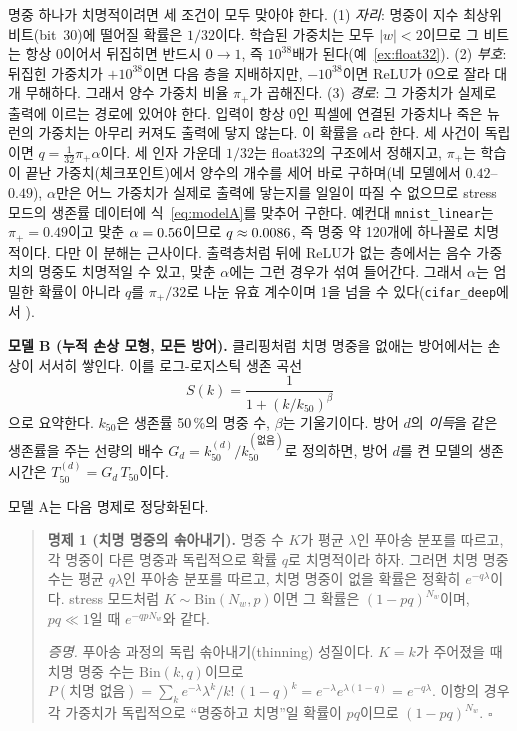 \documentclass[11pt,a4paper]{article}
\newcommand{\code}[1]{\texttt{#1}}
\newcounter{note}
\begin{document}
\begin{note}[$q$의 세 인자]
\label{note:q}
명중 하나가 치명적이려면 세 조건이 모두 맞아야 한다. (1) \emph{자리}: 명중이 지수 최상위 비트(bit~30)에 떨어질 확률은 $1/32$이다. 학습된 가중치는 모두 $|w|<2$이므로 그 비트는 항상 0이어서 뒤집히면 반드시 $0\to1$, 즉 $10^{38}$배가 된다(예~\ref{ex:float32}). (2) \emph{부호}: 뒤집힌 가중치가 $+10^{38}$이면 다음 층을 지배하지만, $-10^{38}$이면 ReLU가 0으로 잘라 대개 무해하다. 그래서 양수 가중치 비율 $\pi_+$가 곱해진다. (3) \emph{경로}: 그 가중치가 실제로 출력에 이르는 경로에 있어야 한다. 입력이 항상 0인 픽셀에 연결된 가중치나 죽은 뉴런의 가중치는 아무리 커져도 출력에 닿지 않는다. 이 확률을 $\alpha$라 한다. 세 사건이 독립이면 $q=\tfrac{1}{32}\pi_+\alpha$이다. 세 인자 가운데 $1/32$는 float32의 구조에서 정해지고, $\pi_+$는 학습이 끝난 가중치(체크포인트)에서 양수의 개수를 세어 바로 구하며(네 모델에서 $0.42$--$0.49$), $\alpha$만은 어느 가중치가 실제로 출력에 닿는지를 일일이 따질 수 없으므로 stress 모드의 생존률 데이터에 식~\eqref{eq:modelA}를 맞추어 구한다. 예컨대 \code{mnist\_linear}는 $\pi_+=0.49$이고 맞춘 $\alpha=0.56{}$이므로 $q\approx0.0086{}$, 즉 명중 약 120개에 하나꼴로 치명적이다. 다만 이 분해는 근사이다. 출력층처럼 뒤에 ReLU가 없는 층에서는 음수 가중치의 명중도 치명적일 수 있고, 맞춘 $\alpha$에는 그런 경우가 섞여 들어간다. 그래서 $\alpha$는 엄밀한 확률이 아니라 $q$를 $\pi_+/32$로 나눈 유효 계수이며 1을 넘을 수 있다(\code{cifar\_deep}에서 \AlphaCifar{}).
\end{note}

\textbf{모델 B (누적 손상 모형, 모든 방어).} 클리핑처럼 치명 명중을 없애는 방어에서는 손상이 서서히 쌓인다. 이를 로그-로지스틱 생존 곡선
\begin{equation}
  S(k) = \frac{1}{1+(k/k_{50})^{\beta}}
  \label{eq:modelB}
\end{equation}
으로 요약한다. $k_{50}$은 생존률 50\,\%의 명중 수, $\beta$는 기울기이다. 방어 $d$의 \emph{이득}을 같은 생존률을 주는 선량의 배수 $G_d = k_{50}^{(d)}/k_{50}^{(\text{없음})}$로 정의하면, 방어 $d$를 켠 모델의 생존 시간은 $T_{50}^{(d)} = G_d\,T_{50}$이다.

모델 A는 다음 명제로 정당화된다.

\begin{quote}
\textbf{명제 1 (치명 명중의 솎아내기).} 명중 수 $K$가 평균 $\lambda$인 푸아송 분포를 따르고, 각 명중이 다른 명중과 독립적으로 확률 $q$로 치명적이라 하자. 그러면 치명 명중 수는 평균 $q\lambda$인 푸아송 분포를 따르고, 치명 명중이 없을 확률은 정확히 $e^{-q\lambda}$이다. stress 모드처럼 $K\sim\mathrm{Bin}(N_w,p)$이면 그 확률은 $(1-pq)^{N_w}$이며, $pq\ll1$일 때 $e^{-qpN_w}$와 같다.

\emph{증명.} 푸아송 과정의 독립 솎아내기(thinning) 성질이다. $K=k$가 주어졌을 때 치명 명중 수는 $\mathrm{Bin}(k,q)$이므로 $P(\text{치명 없음})=\sum_k e^{-\lambda}\lambda^k/k!\,(1-q)^k = e^{-\lambda}e^{\lambda(1-q)} = e^{-q\lambda}$. 이항의 경우 각 가중치가 독립적으로 ``명중하고 치명''일 확률이 $pq$이므로 $(1-pq)^{N_w}$. $\square$
\end{quote}
\end{document}
